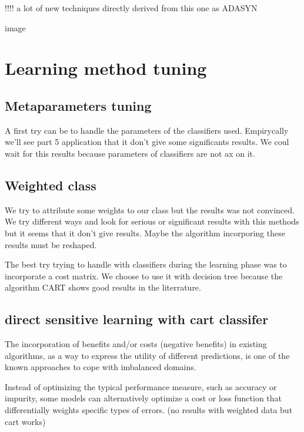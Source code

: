 \documentclass[
]{report}
\begin{document}
!!!! a lot of new techniques directly derived from this one as ADASYN

image

\hypertarget{learning-method-tuning}{%
\section{Learning method tuning}\label{learning-method-tuning}}

\hypertarget{metaparameters-tuning}{%
\subsection{Metaparameters tuning}\label{metaparameters-tuning}}

A first try can be to handle the parameters of the classifiers used. Empirycally we'll see part 5 application that it don't give some significants results. We coul wait for this results because parameters of classifiers are not ax on it.

\hypertarget{weighted-class}{%
\subsection{Weighted class}\label{weighted-class}}

We try to attribute some weights to our class but the results was not convinced. We try different ways and look for serious or significant results with this methods but it seems that it don't give results. Maybe the algorithm incorporing these results must be reshaped.

The best try trying to handle with classifiers during the learning phase was to incorporate a cost matrix. We choose to use it with decision tree because the algorithm CART shows good results in the literrature.

\hypertarget{direct-sensitive-learning-with-cart-classifer}{%
\subsection{direct sensitive learning with cart classifer}\label{direct-sensitive-learning-with-cart-classifer}}

The incorporation of beneﬁts and/or costs (negative beneﬁts) in existing algorithms, as a way to express the utility of diﬀerent predictions, is one of the known approaches to cope with imbalanced domains.

Instead of optimizing the typical performance measure, such as accuracy or impurity, some models can alternatively optimize a cost or loss function that diﬀerentially weights speciﬁc types of errors. (no results with weighted data but cart works)
\end{document}
